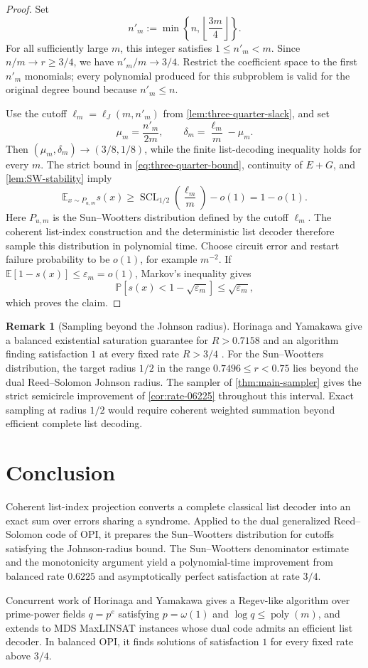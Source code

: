\documentclass[11pt,letterpaper]{article}
\theoremstyle{definition}
\newtheorem{remark}[theorem]{Remark}
\newcommand{\poly}{\operatorname{poly}}
\newcommand{\SCL}{\operatorname{SCL}}
\newcommand{\E}{\mathbb{E}}
\newcommand{\Prb}{\mathbb{P}}
\begin{document}
\begin{proof}
Set
\[
   n'_m:=\min\left\{n,\left\lfloor\frac{3m}{4}\right\rfloor\right\}.
\]
For all sufficiently large $m$, this integer satisfies $1\le n'_m<m$.  Since $n/m\to r\ge3/4$, we have $n'_m/m\to3/4$.  Restrict the coefficient space to the first $n'_m$ monomials; every polynomial produced for this subproblem is valid for the original degree bound because $n'_m\le n$.

Use the cutoff $\ell_m=\ell_J(m,n'_m)$ from \cref{lem:three-quarter-slack}, and set
\[
   \mu_m=\frac{n'_m}{2m},
   \qquad
   \delta_m=\frac{\ell_m}{m}-\mu_m.
\]
Then $(\mu_m,\delta_m)\to(3/8,1/8)$, while the finite list-decoding inequality holds for every $m$.  The strict bound in \cref{eq:three-quarter-bound}, continuity of $E+G$, and \cref{lem:SW-stability} imply
\[
   \E_{x\sim P_{u,m}}s(x)
      \ge \SCL_{1/2}\!\left(\frac{\ell_m}{m}\right)-o(1)
      =1-o(1).
\]
Here $P_{u,m}$ is the Sun--Wootters distribution defined by the cutoff $\ell_m$.  The coherent list-index construction and the deterministic list decoder therefore sample this distribution in polynomial time.  Choose circuit error and restart failure probability to be $o(1)$, for example $m^{-2}$.  If $\E[1-s(x)]\le\varepsilon_m=o(1)$, Markov's inequality gives
\[
   \Prb[s(x)<1-\sqrt{\varepsilon_m}]
      \le\sqrt{\varepsilon_m},
\]
which proves the claim.
\end{proof}

\begin{remark}[Sampling beyond the Johnson radius]
Horinaga and Yamakawa give a balanced existential saturation guarantee for $R>0.7158$ and an algorithm finding satisfaction $1$ at every fixed rate $R>3/4$ \cite{HorinagaYamakawa2026}.  For the Sun--Wootters distribution, the target radius $1/2$ in the range $0.7496\le r<0.75$ lies beyond the dual Reed--Solomon Johnson radius.  The sampler of \cref{thm:main-sampler} gives the strict semicircle improvement of \cref{cor:rate-06225} throughout this interval.  Exact sampling at radius $1/2$ would require coherent weighted summation beyond efficient complete list decoding.
\end{remark}

\section{Conclusion}

Coherent list-index projection converts a complete classical list decoder into an exact sum over errors sharing a syndrome.  Applied to the dual generalized Reed--Solomon code of OPI, it prepares the Sun--Wootters distribution for cutoffs satisfying the Johnson-radius bound.  The Sun--Wootters denominator estimate and the monotonicity argument yield a polynomial-time improvement from balanced rate $0.6225$ and asymptotically perfect satisfaction at rate $3/4$.

Concurrent work of Horinaga and Yamakawa gives a Regev-like algorithm over prime-power fields $q=p^e$ satisfying $p=\omega(1)$ and $\log q\le\poly(m)$, and extends to MDS MaxLINSAT instances whose dual code admits an efficient list decoder.  In balanced OPI, it finds solutions of satisfaction $1$ for every fixed rate above $3/4$.


\end{document}
